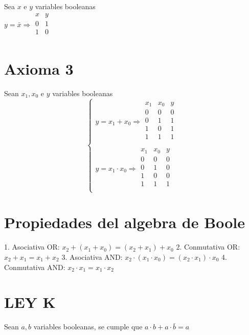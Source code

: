 \documentclass{report}
\begin{document}
Sea $x$ e $y$ variables booleanas \\ $y=\bar{x}\Rightarrow
	\begin{array}{c|c}
		x & y \\ \hline
		0 & 1 \\
		1 & 0 \\
	\end{array}$

\section{Axioma 3}

Sean $x_1 , x_0$ e $y$ variables booleanas \\
$$\begin{cases}
		y = x_1 + x_0 \Rightarrow
		\begin{array}{cc|c}
			x_1 & x_0 & y \\ \hline
			0   & 0   & 0 \\
			0   & 1   & 1 \\
			1   & 0   & 1 \\
			1   & 1   & 1 \\
		\end{array} \\
		y = x_1 \cdot x_0 \Rightarrow
		\begin{array}{cc|c}
			x_1 & x_0 & y \\ \hline
			0   & 0   & 0 \\
			0   & 1   & 0 \\
			1   & 0   & 0 \\
			1   & 1   & 1 \\
		\end{array}
	\end{cases}
$$


\section{Propiedades del algebra de Boole}


1. Asociativa OR: $x_2 + (x_1 + x_0) = (x_2 + x_1) +x_0$
2. Conmutativa OR: $x_2 + x_1 = x_1 + x_2$
3. Asociativa AND: $x_2 \cdot (x_1 \cdot x_0) = (x_2 \cdot x_1) \cdot x_0$
4. Conmutativa AND: $x_2 \cdot x_1 = x_1 \cdot x_2$


\section{LEY K}

Sean $a,b$ variables booleanas, se cumple que $a\cdot b + a\cdot \bar{b} = a$
\end{document}
